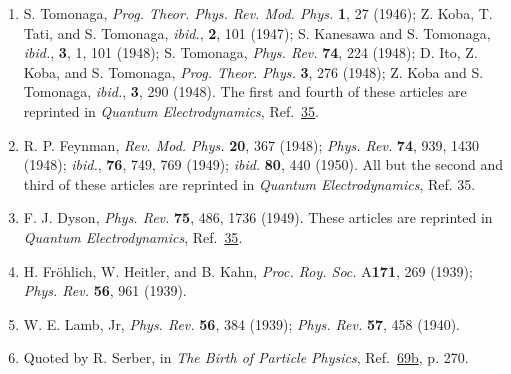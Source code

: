 \begin{enumerate}
\item\label{ref:1.86} S. Tomonaga, \emph{Prog. Theor. Phys. Rev. Mod. Phys.} \textbf{1}, 27
(1946); Z. Koba, T. Tati, and S. Tomonaga, \emph{ibid.}, \textbf{2}, 101
(1947); S. Kanesawa and S. Tomonaga, \emph{ibid.}, \textbf{3}, 1, 101 (1948);
S. Tomonaga, \emph{Phys. Rev.} \textbf{74}, 224 (1948); D. Ito, Z. Koba, and S.
Tomonaga, \emph{Prog. Theor. Phys.} \textbf{3}, 276 (1948); Z. Koba and S.
Tomonaga, \emph{ibid.}, \textbf{3}, 290 (1948). The first and fourth of these
articles are reprinted in \emph{Quantum Electrodynamics}, Ref.~\hyperref[ref:1.35]{35}.

\item\label{ref:1.87} R. P. Feynman, \emph{Rev. Mod. Phys.} \textbf{20}, 367 (1948);
\emph{Phys. Rev.} \textbf{74}, 939, 1430 (1948); \emph{ibid.}, \textbf{76},
749, 769 (1949); \emph{ibid.} \textbf{80}, 440 (1950). All but the second and
third of these articles are reprinted in \emph{Quantum Electrodynamics}, Ref.
35.

\item\label{ref:1.88} F. J. Dyson, \emph{Phys. Rev.} \textbf{75}, 486, 1736 (1949). These
articles are reprinted in \emph{Quantum Electrodynamics}, Ref.~\hyperref[ref:1.35]{35}.

\item[88a.]\label{ref:1.88a} H. Fr\"ohlich, W. Heitler, and B. Kahn, \emph{Proc. Roy. Soc.}
A\textbf{171}, 269 (1939); \emph{Phys. Rev.} \textbf{56}, 961 (1939).

\item[88b.]\label{ref:1.88b} W. E. Lamb, Jr, \emph{Phys. Rev.} \textbf{56}, 384 (1939);
\emph{Phys. Rev.} \textbf{57}, 458 (1940).

\item\label{ref:1.89} Quoted by R. Serber, in \emph{The Birth of Particle Physics}, Ref.~\hyperref[ref:1.69b]{69b},
p. 270.
\end{enumerate}
